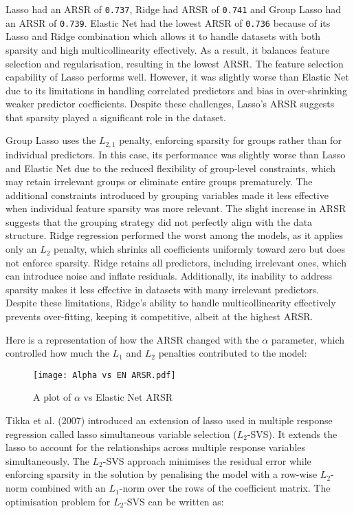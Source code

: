 Lasso had an ARSR of \texttt{0.737}, Ridge had ARSR of \texttt{0.741} and Group Lasso had an ARSR of \texttt{0.739}. Elastic Net had the lowest ARSR of \texttt{0.736} because of its Lasso and Ridge combination which allows it to handle datasets with both sparsity and high multicollinearity effectively. As a result, it balances feature selection and regularisation, resulting in the lowest ARSR. The feature selection capability of Lasso performs well. However, it was slightly worse than Elastic Net due to its limitations in handling correlated predictors and bias in over-shrinking weaker predictor coefficients. Despite these challenges, Lasso's ARSR suggests that sparsity played a significant role in the dataset.

Group Lasso uses the \( L_{2,1} \) penalty, enforcing sparsity for groups rather than for individual predictors. In this case, its performance was slightly worse than Lasso and Elastic Net due to the reduced flexibility of group-level constraints, which may retain irrelevant groups or eliminate entire groups prematurely. The additional constraints introduced by grouping variables made it less effective when individual feature sparsity was more relevant. The slight increase in ARSR suggests that the grouping strategy did not perfectly align with the data structure. Ridge regression performed the worst among the models, as it applies only an \( L_2 \) penalty, which shrinks all coefficients uniformly toward zero but does not enforce sparsity. Ridge retains all predictors, including irrelevant ones, which can introduce noise and inflate residuals. Additionally, its inability to address sparsity makes it less effective in datasets with many irrelevant predictors. Despite these limitations, Ridge's ability to handle multicollinearity effectively prevents over-fitting, keeping it competitive, albeit at the highest ARSR.

Here is a representation of how the ARSR changed with the $\alpha$ parameter, which controlled how much the $L_1$ and $L_2$ penalties contributed to the model:

\begin{figure}[H]
    \centering
    \texttt{[image: Alpha vs EN ARSR.pdf]}
    \caption{A plot of $\alpha$ vs Elastic Net ARSR}
    \label{fig:alphaelasticnet}
\end{figure}


Tikka et al. (2007) introduced an extension of lasso used in multiple response regression called lasso simultaneous variable selection ($L_2$-SVS). It extends the lasso to account for the relationships across multiple response variables simultaneously. The \(L_2\)-SVS approach minimises the residual error while enforcing sparsity in the solution by penalising the model with a row-wise \(L_2\)-norm combined with an \(L_1\)-norm over the rows of the coefficient matrix. The optimisation problem for \(L_2\)-SVS can be written as:

